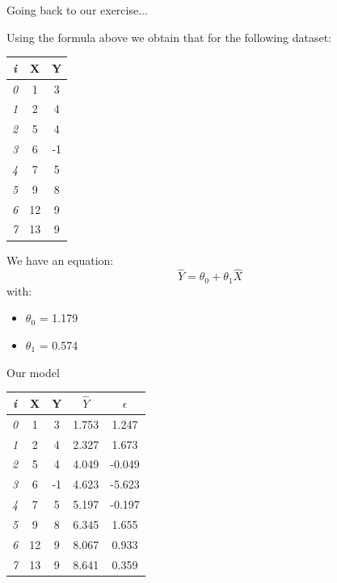 \documentclass{beamer}
\begin{document}
\begin{frame}
{\centerline{Going back to our exercise... }}

Using the formula above we obtain that for the following dataset:

\begin{table}[h!]
\small
  \begin{center}
    \begin{tabular}{|c|c|c|}      
    \hline
     \textit{i} & \textbf{X} & \textbf{Y} \\
    \hline    \hline
	\textit{0} &1 & 3 \\
	\textit{1} &2 & 4 \\
	\textit{2} &5 & 4 \\
	\textit{3} &6 & -1 \\
	\textit{4} &7 & 5 \\
	\textit{5} &9 & 8 \\
	\textit{6} &12 & 9 \\
	\textit{7} &13 & 9 \\ \hline
    \end{tabular}
  \end{center}
\end{table}


We have an equation:
$$ \hat{Y} = \theta_0 + \theta_1 \hat{X} $$
with:
\begin{itemize}
\item $\theta_0$ = 1.179
\item $\theta_1$ = 0.574

\end{itemize}

\end{frame}

\begin{frame}
{\centerline{Our model }}


\begin{table}[h!]
\small
  \begin{center}
    \begin{tabular}{|c|c|c|c|c|}      
    \hline
     \textit{i} & \textbf{X} & \textbf{Y} & \textbf{$\hat{Y}$} & \textbf{$\epsilon$}\\
    \hline    \hline
	\textit{0} &1 & 3 & 1.753 & 1.247 \\
	\textit{1} &2 & 4 & 2.327 & 1.673 \\
	\textit{2} &5 & 4  & 4.049 & -0.049\\
	\textit{3} &6 & -1 & 4.623 & -5.623 \\
	\textit{4} &7 & 5  & 5.197 & -0.197\\
	\textit{5} &9 & 8  & 6.345 & 1.655\\
	\textit{6} &12 & 9  & 8.067 & 0.933\\
	\textit{7} &13 & 9  & 8.641 & 0.359\\ \hline
    \end{tabular}
  \end{center}
\end{table}


\end{frame}
\end{document}
